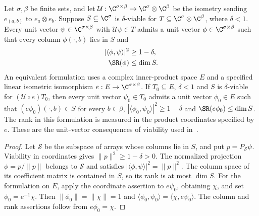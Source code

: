 \begin{theorem}
    \label{thm:viable_unit_schmidt_approximation}
    \leanok
    Let $\sigma,\beta$ be finite sets, and let
    $\mathcal U:\C^{\sigma\times\beta}\to\C^\sigma\otimes\C^\beta$
    be the isometry sending $e_{(a,b)}$ to $e_a\otimes e_b$.
    Suppose $S\subseteq\C^\sigma$ is $\delta$-viable for
    $T\subseteq\C^\sigma\otimes\C^\beta$, where $\delta<1$.
    Every unit vector $\psi\in\C^{\sigma\times\beta}$ with
    $\mathcal U\psi\in T$ admits a unit vector
    $\phi\in\C^{\sigma\times\beta}$ such that every column
    $\phi(\cdot,b)$ lies in $S$ and
    \begin{align}
        |\langle\phi,\psi\rangle|^2 & \ge1-\delta, \\
        \SR(\phi)                   & \le\dim S.
        \label{eq:viable_unit_schmidt_bounds}
    \end{align}
    An equivalent formulation uses a complex inner-product space $E$
    and a specified linear isometric isomorphism
    $e:E\to\C^{\sigma\times\beta}$.
    If $T_0\subseteq E$, $\delta<1$ and $S$ is $\delta$-viable for
    $(\mathcal U\circ e)T_0$, then every unit vector $\psi_0\in T_0$
    admits a unit vector $\phi_0\in E$ such that
    $(e\phi_0)(\cdot,b)\in S$ for every $b\in\beta$,
    $|\langle\phi_0,\psi_0\rangle|^2\ge1-\delta$ and
    $\SR(e\phi_0)\le\dim S$.
    The rank in this formulation is measured in the product coordinates
    specified by $e$.
    These are the unit-vector consequences of viability used
    in~\cite[lines 1080--1094]{Arad2016RigorousRG}.
\end{theorem}

\begin{proof}
    \leanok
    Let $\mathcal S$ be the subspace of arrays whose columns lie in $S$,
    and put $p=P_{\mathcal S}\psi$. Viability in coordinates gives
    $\|p\|^2\ge1-\delta>0$. The normalized projection
    $\phi=p/\|p\|$ belongs to $\mathcal S$ and satisfies
    $|\langle\phi,\psi\rangle|^2=\|p\|^2$.
    The column space of its coefficient matrix is contained in $S$,
    so its rank is at most $\dim S$.
    For the formulation on $E$, apply the coordinate assertion to
    $e\psi_0$, obtaining $\chi$, and set $\phi_0=e^{-1}\chi$.
    Then $\|\phi_0\|=\|\chi\|=1$ and
    $\langle\phi_0,\psi_0\rangle=\langle\chi,e\psi_0\rangle$.
    The column and rank assertions follow from $e\phi_0=\chi$.
\end{proof}

